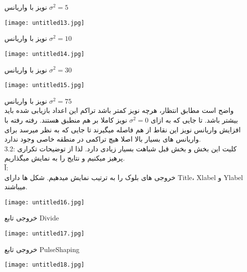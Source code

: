 \centering
نویز با واریانس ${\sigma}^2 = 5$
\\[1cm]


\begin{center}
    \texttt{[image: untitled13.jpg]}
\end{center}

\centering
نویز با واریانس ${\sigma}^2 = 10$
\\[0.5cm]


\begin{center}
    \texttt{[image: untitled14.jpg]}
\end{center}

\centering
نویز با واریانس ${\sigma}^2 = 30$
\\[1cm]


\begin{center}
    \texttt{[image: untitled15.jpg]}
\end{center}

\centering
نویز با واریانس ${\sigma}^2 = 75$
\\[0.5cm]

\justify
واضح است مطابق انتظار، هرچه نویز کمتر باشد تراکم این اعداد بازیابی شده باید بیشتر باشد. تا جایی که به ازای ${\sigma}^2 = 0$ نویز کاملا بر هم منطبق هستند. رفته رفته با افزایش واریانس نویز این نقاط از هم فاصله میگیرند تا جایی که به نظر میرسد برای واریانس های بسیار بالا اصلا هیچ تراکمی در منطقه خاصی وجود ندارد.
\\[1.5cm]
\large
3.2: 
کلیت این بخش و بخش قبل شباهت بسیار زیادی دارد. لذا از توضیحات تکراری پرهیز میکنیم و نتایج را به نمایش میگذاریم.
\\[1cm]
آ:
\\
خروجی های بلوک را به ترتیب نمایش میدهیم. شکل ها دارای Title، Xlabel و Ylabel میباشند.

\begin{center}
    \texttt{[image: untitled16.jpg]}
\end{center}

\centering
خروجی تابع Divide


\begin{center}
    \texttt{[image: untitled17.jpg]}
\end{center}

\centering
خروجی تابع PulseShaping


\begin{center}
    \texttt{[image: untitled18.jpg]}
\end{center}

